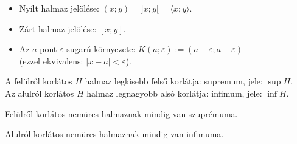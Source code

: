 
\begin{blueBox}
  \begin{itemize}
    \item Nyílt halmaz jelölése: $(x; y) = ]x; y[ = \langle x; y \rangle$.
    \item Zárt halmaz jelölése: $[x; y]$.
    \item Az $a$ pont $\varepsilon$ sugarú környezete: $K(a; \varepsilon) := (a
          - \varepsilon; a + \varepsilon)$ \\ (ezzel ekvivalens: $|x-a| <
          \varepsilon$).
  \end{itemize}

  \begin{center}
  \end{center}
\end{blueBox}

\begin{definition}
  A felülről korlátos $H$ halmaz legkisebb felső korlátja: supremum, jele: $\sup
    H$.
  \\
  Az alulról korlátos $H$ halmaz legnagyobb alsó korlátja: infimum, jele: $\inf
    H$.
\end{definition}

\begin{theorem}
  Felülről korlátos nemüres halmaznak mindig van szuprémuma.
\end{theorem}

\begin{theorem}
  Alulról korlátos nemüres halmaznak mindig van infimuma.
\end{theorem}